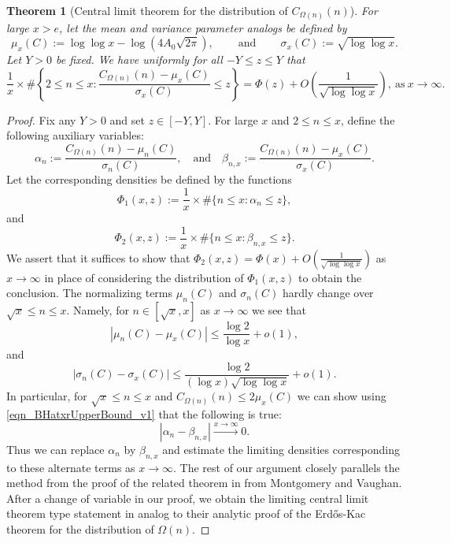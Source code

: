 \documentclass[11pt,reqno,a4letter]{article}
\numberwithin{figure}{section}
\numberwithin{table}{section}
\theoremstyle{plain}
\newtheorem{theorem}{Theorem}
\numberwithin{theorem}{section}
\theoremstyle{definition}
\begin{document}
\begin{theorem}[Central limit theorem for the distribution of $C_{\Omega(n)}(n)$] 
\label{theorem_CLT_VI} 
For large $x > e$, let the mean and variance parameter analogs be defined by 
\[
     \mu_x(C) := \log\log x - \log\left(4A_0\sqrt{2\pi}\right), 
     \qquad \mathrm{\ and\ } \qquad 
     \sigma_x(C) := \sqrt{\log\log x}. 
\]
Let $Y > 0$ be fixed. 
We have uniformly for all $-Y \leq z \leq Y$ that 
\[
\frac{1}{x} \times \#\left\{2 \leq n \leq x: 
     \frac{C_{\Omega(n)}(n) - \mu_x(C)}{\sigma_x(C)} \leq z\right\} = 
     \Phi\left(z\right) + O\left(\frac{1}{\sqrt{\log\log x}}\right), 
     \mathrm{\ as\ } x \rightarrow \infty. 
\] 
\end{theorem} 
\begin{proof} 
Fix any $Y > 0$ and set $z \in [-Y, Y]$. 
For large $x$ and $2 \leq n \leq x$, define the following auxiliary variables: 
\[
\alpha_n := \frac{C_{\Omega(n)}(n) - \mu_n(C)}{\sigma_n(C)}, \quad\mathrm{and}\quad 
     \beta_{n,x} := \frac{C_{\Omega(n)}(n) - \mu_x(C)}{\sigma_x(C)}. 
\] 
Let the corresponding densities be defined by the functions 
\[
\Phi_1(x, z) := \frac{1}{x} \times \#\{n \leq x: \alpha_n \leq z\}, 
\]
and 
\[
\Phi_2(x, z) := \frac{1}{x} \times \#\{n \leq x: \beta_{n,x} \leq z\}. 
\] 
We assert that it suffices to show that $\Phi_2(x, z) = \Phi(x) + O\left(\frac{1}{\sqrt{\log\log x}}\right)$ as 
$x \rightarrow \infty$ in place of considering the distribution of 
$\Phi_1(x, z)$ to obtain the conclusion. 
The normalizing terms $\mu_n(C)$ and $\sigma_n(C)$ hardly change over 
$\sqrt{x} \leq n \leq x$. Namely, for $n \in [\sqrt{x}, x]$ 
as $x \rightarrow \infty$ we see that 
\[
|\mu_n(C) - \mu_x(C)| \leq 
     \frac{\log 2}{\log x} + o(1), 
\]
and 
\[
|\sigma_n(C) - \sigma_x(C)| 
     \leq \frac{\log 2}{(\log x) \sqrt{\log\log x}} + o(1). 
\]
In particular, for 
$\sqrt{x} \leq n \leq x$ and $C_{\Omega(n)}(n) \leq 2 \mu_x(C)$ we can show 
using \eqref{eqn_BHatxrUpperBound_v1} 
that the following is true: 
\[
|\alpha_n - \beta_{n,x}| \xrightarrow{x \rightarrow \infty} 0. 
\]
Thus we can replace $\alpha_n$ by $\beta_{n,x}$ and estimate the limiting 
densities corresponding to these alternate terms as $x \rightarrow \infty$. 
The rest of our argument closely parallels the method from the proof of the related theorem in 
\cite[Thm.\ 7.21; \S 7.4]{MV} from Montgomery and Vaughan. 
After a change of variable in our proof, we obtain the limiting 
central limit theorem type statement in analog to their 
analytic proof of the Erd\H{o}s-Kac theorem for the distribution of $\Omega(n)$. 


\end{proof}
\end{document}
